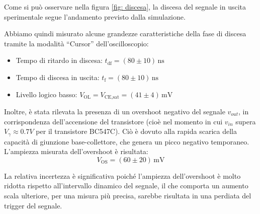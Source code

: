 \documentclass[a4paper,12pt]{article}
\begin{document}
Come si può osservare nella figura \ref{fig: discesa}, la discesa del segnale in uscita sperimentale segue l’andamento previsto dalla simulazione.

Abbiamo quindi misurato alcune grandezze caratteristiche della fase di discesa tramite la modalità “Cursor” dell’oscilloscopio:

\begin{itemize}
  \item Tempo di ritardo in discesa: \(t_{\text{df}} = (80 \pm 10)\,\mathrm{ns}\)
  \item Tempo di discesa in uscita: \(t_{\text{f}} = (80 \pm 10)\,\mathrm{ns}\)
  \item Livello logico basso: \(V_{\text{OL}} = V_{\text{CE,sat}} = (41 \pm 4)\,\mathrm{mV}\)
\end{itemize}

Inoltre, è stata rilevata la presenza di un overshoot negativo del segnale \(v_{out}\), in corrispondenza dell'accensione del transistore (cioè nel momento in cui \(v_{in}\) supera \(V_\gamma \approx 0.7 V\) per il transistore BC547C). Ciò è dovuto alla rapida scarica della capacità di giunzione base-collettore, che genera un picco negativo temporaneo. L'ampiezza misurata dell'overshoot è risultata:
\[
V_{\text{OS}} = (60 \pm 20)\,\mathrm{mV}
\]

La relativa incertezza è significativa poiché l’ampiezza dell’overshoot è molto ridotta rispetto all’intervallo dinamico del segnale, il che comporta un aumento scala ulteriore, per una misura più precisa, sarebbe risultata in una perdiata del trigger del segnale.



\end{document}
